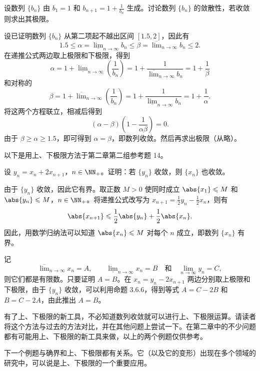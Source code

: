 \begin{xexample}[3.6.2]
设数列 $\{b_n\}$ 由 $b_1=1$ 和 $b_{n+1}=1+\frac1{b_n}$ 生成。讨论数列 $\{b_n\}$ 的敛散性，若收敛则求出其极限。
\end{xexample}
\begin{xsolution}
设已证明数列 $\{b_n\}$ 从第二项起不越出区间 $[1.5,2]$，因此有
\[
  1.5\leqslant\alpha=\underline{\lim}_{n\to\infty}b_n
  \leqslant\beta=\overline{\lim}_{n\to\infty}b_n\leqslant2.
\]
在递推公式两边取上极限和下极限，得到
\[
  \alpha=1+\underline{\lim}_{n\to\infty}\left(\frac1{b_n}\right)
  =1+\frac1{\overline{\lim}_{n\to\infty}b_n}
  =1+\frac1\beta
\]
和对称的
\[
  \beta=1+\overline{\lim}_{n\to\infty}\left(\frac1{b_n}\right)
  =1+\frac1{\underline{\lim}_{n\to\infty}b_n}
  =1+\frac1\alpha.
\]
将这两个方程联立，相减后得到
\[
  (\alpha-\beta)\left(1-\frac1{\alpha\beta}\right)=0.
\]
由于 $\beta\geqslant\alpha\geqslant1.5$，即可得到 $\alpha=\beta$，即数列收敛。然后再求出极限（从略）。
\end{xsolution}

以下是用上、下极限方法于第二章第二组参考题 14。

\begin{xexample}[3.6.3]
设 $y_n=x_n+2x_{n+1}$，$n\in\NN_+$。证明：若 $\{y_n\}$ 收敛，则 $\{x_n\}$ 也收敛。
\end{xexample}
\begin{xproof}
由于 $\{y_n\}$ 收敛，因此它有界。取正数 $M>0$ 使同时成立 $\abs{x_1}\leqslant M$ 和 $\abs{y_n}\leqslant M$，$n\in\NN_+$。将递推公式改写为 $x_{n+1}=\frac12y_n-\frac12x_n$，则有
\[
  \abs{x_{n+1}}\leqslant\frac12\abs{y_n}+\frac12\abs{x_n}.
\]
因此，用数学归纳法可以知道 $\abs{x_n}\leqslant M$ 对每个 $n$ 成立，即数列 $\{x_n\}$ 有界。

记
\[
  \overline{\lim}_{n\to\infty}x_n=A,\qquad
  \underline{\lim}_{n\to\infty}x_n=B
  \quad\text{和}\quad
  \lim_{n\to\infty}y_n=C,
\]
则它们都是有限数。只要证明 $A=B$。在 $x_n=y_n-2x_{n+1}$ 两边分别取上极限和下极限，由于 $\{y_n\}$ 收敛，可以利用命题 3.6.6，得到等式 $A=C-2B$ 和 $B=C-2A$，由此推出 $A=B$。
\end{xproof}

\begin{xremark}
有了上、下极限的新工具，不必知道数列收敛就可以进行上、下极限运算。请读者将这个方法与过去的方法对比，并在其他问题上尝试一下。在第二章中的不少问题都有可能用上、下极限的新工具来做，以上的两个例题仅供参考。
\end{xremark}

下一个例题与确界和上、下极限都有关系。它（以及它的变形）出现在多个领域的研究中，可以说是上、下极限的一个重要应用。


